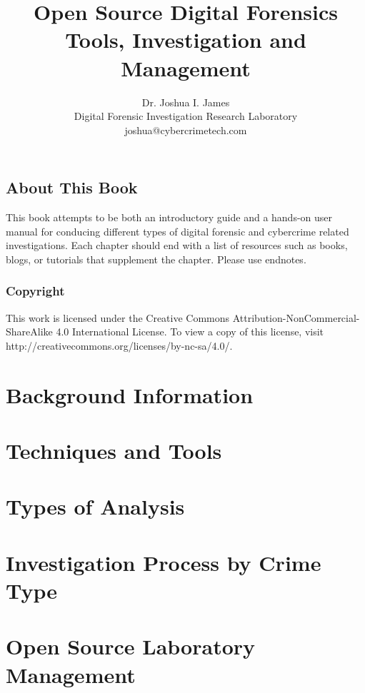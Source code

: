 \documentclass[12pt,a4paper]{book}
\author{Dr. Joshua I. James\\
Digital Forensic Investigation Research Laboratory\\
joshua@cybercrimetech.com}
\title{Open Source Digital Forensics\\Tools, Investigation and Management}
\begin{document}
\maketitle

\frontmatter
\chapter{About This Book}
This book attempts to be both an introductory guide and a hands-on user manual for conducing different types of digital forensic and cybercrime related investigations. Each chapter should end with a list of resources such as books, blogs, or tutorials that supplement the chapter. Please use endnotes.

\section*{Copyright}
This work is licensed under the Creative Commons Attribution-NonCommercial-ShareAlike 4.0 International License. To view a copy of this license, visit http://creativecommons.org/licenses/by-nc-sa/4.0/.

\tableofcontents

\mainmatter



\part{Background Information}

\part{Techniques and Tools}
\part{Types of Analysis}
\part{Investigation Process by Crime Type}
\part{Open Source Laboratory Management}


\backmatter
\end{document}

